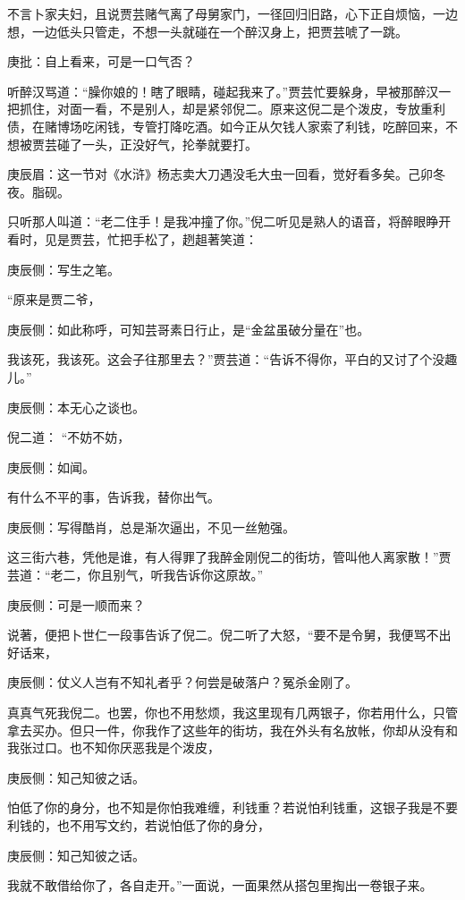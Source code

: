 \begin{parag}
    不言卜家夫妇，且说贾芸赌气离了母舅家门，一径回归旧路，心下正自烦恼，一边想，一边低头只管走，不想一头就碰在一个醉汉身上，把贾芸唬了一跳。\begin{note}庚批：自上看来，可是一口气否？\end{note}听醉汉骂道：“臊你娘的！瞎了眼睛，碰起我来了。”贾芸忙要躲身，早被那醉汉一把抓住，对面一看，不是别人，却是紧邻倪二。原来这倪二是个泼皮，专放重利债，在赌博场吃闲钱，专管打降吃酒。如今正从欠钱人家索了利钱，吃醉回来，不想被贾芸碰了一头，正没好气，抡拳就要打。\begin{note}庚辰眉：这一节对《水浒》杨志卖大刀遇没毛大虫一回看，觉好看多矣。己卯冬夜。脂砚。\end{note}只听那人叫道：“老二住手！是我冲撞了你。”倪二听见是熟人的语音，将醉眼睁开看时，见是贾芸，忙把手松了，趔趄著笑道：\begin{note}庚辰侧：写生之笔。\end{note}“原来是贾二爷，\begin{note}庚辰侧：如此称呼，可知芸哥素日行止，是“金盆虽破分量在”也。\end{note}我该死，我该死。这会子往那里去？”贾芸道：“告诉不得你，平白的又讨了个没趣儿。”\begin{note}庚辰侧：本无心之谈也。\end{note}倪二道： “不妨不妨，\begin{note}庚辰侧：如闻。\end{note}有什么不平的事，告诉我，替你出气。\begin{note}庚辰侧：写得酷肖，总是渐次逼出，不见一丝勉强。\end{note}这三街六巷，凭他是谁，有人得罪了我醉金刚倪二的街坊，管叫他人离家散！”贾芸道：“老二，你且别气，听我告诉你这原故。”\begin{note}庚辰侧：可是一顺而来？\end{note}说著，便把卜世仁一段事告诉了倪二。倪二听了大怒，“要不是令舅，我便骂不出好话来，\begin{note}庚辰侧：仗义人岂有不知礼者乎？何尝是破落户？冤杀金刚了。\end{note}真真气死我倪二。也罢，你也不用愁烦，我这里现有几两银子，你若用什么，只管拿去买办。但只一件，你我作了这些年的街坊，我在外头有名放帐，你却从没有和我张过口。也不知你厌恶我是个泼皮，\begin{note}庚辰侧：知己知彼之话。\end{note}怕低了你的身分，也不知是你怕我难缠，利钱重？若说怕利钱重，这银子我是不要利钱的，也不用写文约，若说怕低了你的身分，\begin{note}庚辰侧：知己知彼之话。\end{note}我就不敢借给你了，各自走开。”一面说，一面果然从搭包里掏出一卷银子来。
\end{parag}


